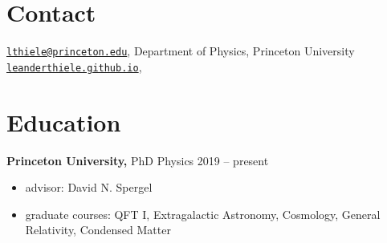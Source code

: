 \documentclass[margin]{res}
\begin{document}
 

\vspace*{0.8cm}


\begin{resume} 


\vspace*{-0.5cm}
\section{Contact}
\href{mailto:lthiele@princeton.edu}{\texttt{lthiele@princeton.edu}},
Department of Physics, Princeton University\\
\href{https://leanderthiele.github.io}{\texttt{leanderthiele.github.io}},



\section{Education}
	{\bf Princeton University,} PhD Physics \hfill 2019 -- present
	\begin{itemize} \itemsep -2pt
		\item advisor: David N. Spergel
		\item graduate courses: QFT I, Extragalactic Astronomy,
		Cosmology, General Relativity, Condensed Matter
	\end{itemize}
	

\end{resume}
\end{document}
